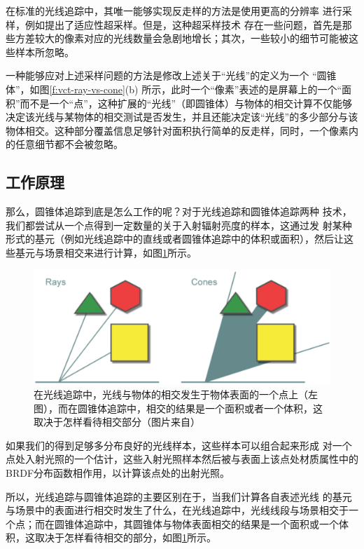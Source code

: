 在标准的光线追踪中，其唯一能够实现反走样的方法是使用更高的分辨率 进行采样，例如\cite{a:ray-tracing}提出了适应性超采样。但是，这种超采样技术 存在一些问题，首先是那些方差较大的像素对应的光线数量会急剧地增长；其次，一些较小的细节可能被这些样本所忽略。

一种能够应对上述采样问题的方法是修改上述关于“光线”的定义为一个 “圆锥体”，如图\ref{f:vct-ray-vs-cone}(b) 所示，此时一个“像素”表述的是屏幕上的一个“面积”而不是一个“点”，这种扩展的“光线”（即圆锥体）与物体的相交计算不仅能够决定该光线与某物体的相交测试是否发生，并且还能决定该“光线”的多少部分与该物体相交。这种部分覆盖信息足够针对面积执行简单的反走样，同时，一个像素内的任意细节都不会被忽略。



\subsection{工作原理}
那么，圆锥体追踪到底是怎么工作的呢？对于光线追踪和圆锥体追踪两种 技术，我们都尝试从一个点得到一定数量的关于入射辐射亮度的样本，这通过发 射某种形式的基元（例如光线追踪中的直线或者圆锥体追踪中的体积或面积），然后让这些基元与场景相交来进行计算，如图\ref{f:vct-2-1}所示。

\begin{figure}
	\includegraphics[width=\textwidth]{figures/vct/vct-2-1}
	\caption{在光线追踪中，光线与物体的相交发生于物体表面的一个点上（左图），而在圆锥体追踪中，相交的结果是一个面积或者一个体积，这取决于怎样看待相交部分（图片来自\cite{a:TheTechnologyofTheTomorrowChildren}）}
	\label{f:vct-2-1}
\end{figure}

如果我们的得到足够多分布良好的光线样本，这些样本可以组合起来形成 对一个点处入射光照的一个估计，这些入射光照样本然后被与表面上该点处材质属性中的BRDF分布函数相作用，以计算该点处的出射光照。

所以，光线追踪与圆锥体追踪的主要区别在于，当我们计算各自表述光线 的基元与场景中的表面进行相交时发生了什么，在光线追踪中，光线线段与场景相交于一个点；而在圆锥体追踪中，其圆锥体与物体表面相交的结果是一个面积或一个体积，这取决于怎样看待相交的部分，如图\ref{f:vct-2-1}所示。

